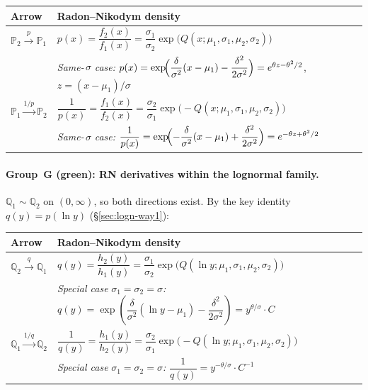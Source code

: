 \documentclass[11pt,a4paper]{article}
\begin{document}
\begin{center}
\renewcommand{\arraystretch}{1.8}
\begin{tabular}{ll}
\toprule
Arrow & Radon--Nikodym density \\
\midrule
$\mathbb{P}_2\xrightarrow{p}\mathbb{P}_1$
  & $p(x)=\dfrac{f_2(x)}{f_1(x)}
    =\dfrac{\sigma_1}{\sigma_2}\exp\!\bigl(Q(x;\mu_1,\sigma_1,\mu_2,\sigma_2)\bigr)$ \\[4pt]
& \quad\textit{Same-}\,$\sigma$\textit{ case:}\quad
  $p(x)=\exp\!\Bigl(\dfrac{\delta}{\sigma^2}(x-\mu_1)-\dfrac{\delta^2}{2\sigma^2}\Bigr)
       =e^{\theta z-\theta^2/2}$,\; $z=(x-\mu_1)/\sigma$ \\[6pt]
$\mathbb{P}_1\xrightarrow{1/p}\mathbb{P}_2$
  & $\dfrac{1}{p(x)}=\dfrac{f_1(x)}{f_2(x)}
    =\dfrac{\sigma_2}{\sigma_1}\exp\!\bigl(-Q(x;\mu_1,\sigma_1,\mu_2,\sigma_2)\bigr)$ \\[4pt]
& \quad\textit{Same-}\,$\sigma$\textit{ case:}\quad
  $\dfrac{1}{p(x)}
  =\exp\!\Bigl(-\dfrac{\delta}{\sigma^2}(x-\mu_1)+\dfrac{\delta^2}{2\sigma^2}\Bigr)
       =e^{-\theta z+\theta^2/2}$ \\
\bottomrule
\end{tabular}
\end{center}

\paragraph{Group~G (green): RN derivatives within the lognormal family.}
$\mathbb{Q}_1\sim\mathbb{Q}_2$ on $(0,\infty)$, so both directions exist.
By the key identity $q(y)=p(\ln y)$ (\S\ref{sec:logn-way1}):

\begin{center}
\renewcommand{\arraystretch}{1.8}
\begin{tabular}{ll}
\toprule
Arrow & Radon--Nikodym density \\
\midrule
$\mathbb{Q}_2\xrightarrow{q}\mathbb{Q}_1$
  & $q(y)=\dfrac{h_2(y)}{h_1(y)}
    =\dfrac{\sigma_1}{\sigma_2}\exp\!\bigl(Q(\ln y;\mu_1,\sigma_1,\mu_2,\sigma_2)\bigr)$ \\[4pt]
& \quad\textit{Special case }$\sigma_1=\sigma_2=\sigma$\textit{:}\quad
  $q(y)=\exp\!\left(\dfrac{\delta}{\sigma^2}(\ln y-\mu_1)-\dfrac{\delta^2}{2\sigma^2}\right)
       =y^{\theta/\sigma}\cdot C$ \\[6pt]
$\mathbb{Q}_1\xrightarrow{1/q}\mathbb{Q}_2$
  & $\dfrac{1}{q(y)}=\dfrac{h_1(y)}{h_2(y)}
    =\dfrac{\sigma_2}{\sigma_1}\exp\!\bigl(-Q(\ln y;\mu_1,\sigma_1,\mu_2,\sigma_2)\bigr)$ \\[4pt]
& \quad\textit{Special case }$\sigma_1=\sigma_2=\sigma$\textit{:}\quad
  $\dfrac{1}{q(y)}=y^{-\theta/\sigma}\cdot C^{-1}$ \\
\bottomrule
\end{tabular}
\end{center}
\end{document}
